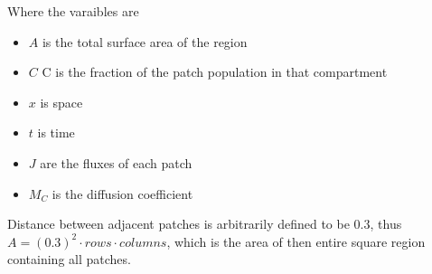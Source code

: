 \documentclass[12pt]{article}\usepackage[]{graphicx}\usepackage[]{color}
\begin{document}
Where the varaibles are
\begin{itemize}
    \item $A$ is the total surface area of the region
    \item $C$ C is the fraction of the patch population in that compartment
    \item $x$ is space
    \item $t$ is time
    \item $J$ are the fluxes of each patch
    \item $M_C$ is the diffusion coefficient
\end{itemize}
Distance between adjacent patches is arbitrarily defined to be $0.3$, thus $A= (0.3)^2 \cdot rows \cdot columns$, which is the area of then entire square region containing all patches.\\
\end{document}
